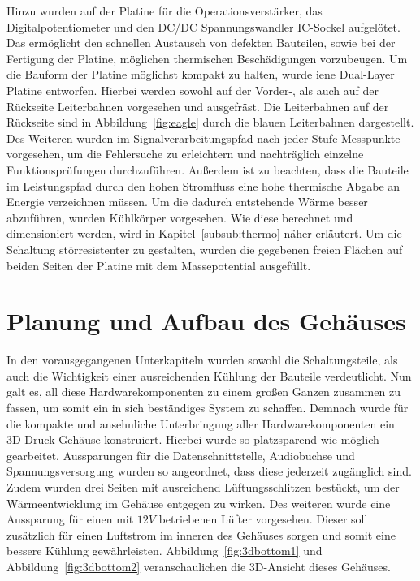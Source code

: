 Hinzu wurden auf der Platine für die Operationsverstärker, das Digitalpotentiometer und den DC/DC Spannungswandler IC-Sockel aufgelötet. Das ermöglicht den schnellen Austausch von defekten Bauteilen, sowie bei der Fertigung der Platine, möglichen thermischen Beschädigungen vorzubeugen. Um die Bauform der Platine möglichst kompakt zu halten, wurde iene Dual-Layer Platine entworfen. Hierbei werden sowohl auf der Vorder-, als auch auf der Rückseite Leiterbahnen vorgesehen und ausgefräst. Die Leiterbahnen auf der Rückseite sind in Abbildung~\ref{fig:eagle} durch die blauen Leiterbahnen dargestellt. Des Weiteren wurden im Signalverarbeitungspfad nach jeder Stufe Messpunkte vorgesehen, um die Fehlersuche zu erleichtern und nachträglich einzelne Funktionsprüfungen durchzuführen. Außerdem ist zu beachten, dass die Bauteile im Leistungspfad durch den hohen Stromfluss eine hohe thermische Abgabe an Energie verzeichnen müssen. Um die dadurch entstehende Wärme besser abzuführen, wurden Kühlkörper vorgesehen. Wie diese berechnet und dimensioniert werden, wird in Kapitel~\ref{subsub:thermo} näher erläutert. Um die Schaltung störresistenter zu gestalten, wurden die gegebenen freien Flächen auf beiden Seiten der Platine mit dem Massepotential ausgefüllt. 

\newpage
\section{Planung und Aufbau des Gehäuses}
\label{sec:geh}

In den vorausgegangenen Unterkapiteln wurden sowohl die Schaltungsteile, als auch die Wichtigkeit einer ausreichenden Kühlung der Bauteile verdeutlicht. Nun galt es, all diese Hardwarekomponenten zu einem großen Ganzen zusammen zu fassen, um somit ein in sich beständiges System zu schaffen. Demnach wurde für die kompakte und ansehnliche Unterbringung aller Hardwarekomponenten ein 3D-Druck-Gehäuse konstruiert. Hierbei wurde so platzsparend wie möglich gearbeitet. Aussparungen für die Datenschnittstelle, Audiobuchse und Spannungsversorgung wurden so angeordnet, dass diese jederzeit zugänglich sind. Zudem wurden drei Seiten mit ausreichend Lüftungsschlitzen bestückt, um der Wärmeentwicklung im Gehäuse entgegen zu wirken. Des weiteren wurde eine Aussparung für einen mit $12V$ betriebenen Lüfter vorgesehen. Dieser soll zusätzlich für einen Luftstrom im inneren des Gehäuses sorgen und somit eine bessere Kühlung gewährleisten. Abbildung~\ref{fig:3dbottom1} und Abbildung~\ref{fig:3dbottom2} veranschaulichen die 3D-Ansicht dieses Gehäuses.

